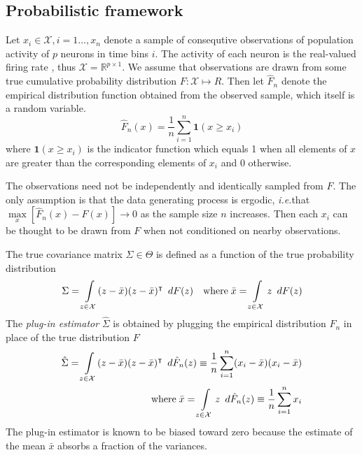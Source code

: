 \subsection{Probabilistic framework}
Let $x_i \in \mathcal X, i=1\ldots,x_n$ denote a sample of consequtive observations of population activity of $p$ neurons in time bins $i$.  
The activity of each neuron is the real-valued firing rate , thus  $\mathcal X = \mathbb R^{p\times 1}$.  
We assume that observations are drawn from some true cumulative probability distribution $F: \mathcal X \mapsto R$. Then let $\hat F_n$ denote the empirical distribution function obtained from the observed sample, which itself is a random variable.
\begin{equation}
\hat F_n(x) = \frac 1 n \sum\limits_{i=1}^n \mathbf{1}(x \ge x_i)
\end{equation}
where $\mathbf 1(x \ge x_i)$ is the indicator function which equals 1 when all elements of $x$ are greater than the corresponding elements of $x_i$ and 0 otherwise. 

The observations need not be independently and identically sampled from $F$. The only assumption is that the data generating process is ergodic, \emph{i.e.}\;that $\max\limits_x \left[\hat F_n(x) - F(x)\right] \to 0$ as the sample size $n$ increases. Then each $x_i$ can be thought to be drawn from $F$ when not conditioned on nearby observations.

The true covariance matrix $\Sigma \in \Theta$ is defined as a function of the true probability distribution
\begin{equation}
\Sigma = \int\limits_{z\in\mathcal X} (z - \bar x)(z - \bar x)^\intercal \mathop{}\,d F(z)
\quad\mbox{where}\;
\bar x = \int\limits_{z\in\mathcal X} z \mathop{}\,d F(z)
\end{equation}
The \emph{plug-in estimator} $\hat\Sigma$ is obtained by plugging the empirical distribution $F_n$ in place of the true distribution $F$
\begin{equation}
\begin{split}
\hat\Sigma = \int\limits_{z\in\mathcal X} (z - \bar x)(z - \bar x)^\intercal \mathop{}\,d \hat F_n(z) 
\equiv \frac  1 n\sum\limits_{i=1}^n (x_i-\bar x)(x_i - \bar x)
\\
\mbox{where}\;\bar x = 
\int\limits_{z\in \mathcal X}z \mathop{}\,d \hat F_n(z) \equiv \frac 1 n\sum\limits_{i=1}^n x_i
\end{split}
\end{equation}
The plug-in estimator is known to be biased toward zero because the estimate of the mean $\bar x$ absorbs a fraction of the variances. 

